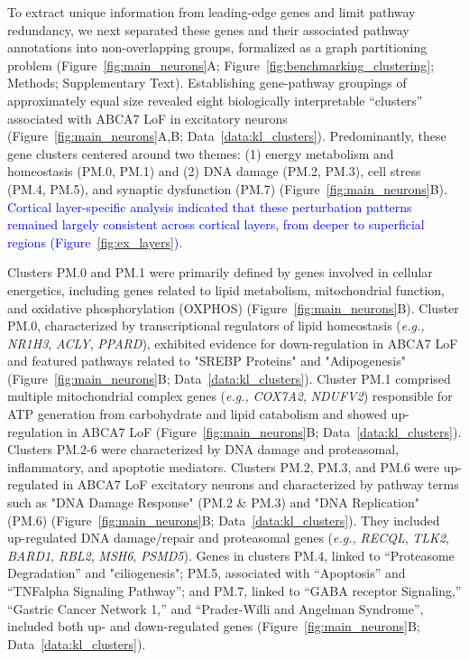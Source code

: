 \documentclass[12pt]{article}
\begin{document}
To extract unique information from leading-edge genes and limit pathway redundancy, we next separated these genes and their associated pathway annotations into non-overlapping groups, formalized as a graph partitioning problem (Figure~\ref{fig:main_neurons}A; Figure~\ref{fig:benchmarking_clustering}; Methods; Supplementary Text). Establishing gene-pathway groupings of approximately equal size revealed eight biologically interpretable “clusters” associated with ABCA7 LoF in excitatory neurons (Figure~\ref{fig:main_neurons}A,B; Data~\ref{data:kl_clusters}). Predominantly, these gene clusters centered around two themes: (1) energy metabolism and homeostasis (PM.0, PM.1) and (2) DNA damage (PM.2, PM.3), cell stress (PM.4, PM.5), and synaptic dysfunction (PM.7) (Figure~\ref{fig:main_neurons}B). \newcommand{\quoteLayer}{\textcolor{blue}{Cortical layer-specific analysis indicated that these perturbation patterns remained largely consistent across cortical layers, from deeper to superficial regions (Figure~\ref{fig:ex_layers}).}\label{quoteLayer-label}}\quoteLayer

Clusters PM.0 and PM.1 were primarily defined by genes involved in cellular energetics, including genes related to lipid metabolism, mitochondrial function, and oxidative phosphorylation (OXPHOS) (Figure~\ref{fig:main_neurons}B). Cluster PM.0, characterized by transcriptional regulators of lipid homeostasis (\textit{e.g.,} \textit{NR1H3}, \textit{ACLY}, \textit{PPARD}), exhibited evidence for down-regulation in ABCA7 LoF and featured pathways related to "SREBP Proteins" and "Adipogenesis" (Figure~\ref{fig:main_neurons}B; Data~\ref{data:kl_clusters}). Cluster PM.1 comprised multiple mitochondrial complex genes (\textit{e.g.,} \textit{COX7A2}, \textit{NDUFV2}) responsible for ATP generation from carbohydrate and lipid catabolism and showed up-regulation in ABCA7 LoF (Figure~\ref{fig:main_neurons}B; Data~\ref{data:kl_clusters}). Clusters PM.2-6 were characterized by DNA damage and proteasomal, inflammatory, and apoptotic mediators. Clusters PM.2, PM.3, and PM.6 were up-regulated in ABCA7 LoF excitatory neurons and characterized by pathway terms such as "DNA Damage Response" (PM.2 \& PM.3) and "DNA Replication" (PM.6) (Figure~\ref{fig:main_neurons}B; Data~\ref{data:kl_clusters}). They included up-regulated DNA damage/repair and proteasomal genes (\textit{e.g.,} \textit{RECQL}, \textit{TLK2}, \textit{BARD1}, \textit{RBL2}, \textit{MSH6}, \textit{PSMD5}). Genes in clusters PM.4, linked to “Proteasome Degradation” and "ciliogenesis"; PM.5, associated with “Apoptosis” and “TNFalpha Signaling Pathway”; and PM.7, linked to “GABA receptor Signaling,” “Gastric Cancer Network 1,” and “Prader-Willi and Angelman Syndrome”, included both up- and down-regulated genes (Figure~\ref{fig:main_neurons}B; Data~\ref{data:kl_clusters}).
\end{document}

